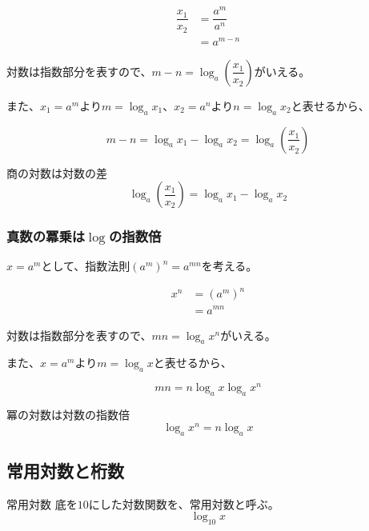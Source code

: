 \documentclass[../math-imaging]{subfiles}
\begin{document}
\begin{align}
  \dfrac{x_1}{x_2} & = \dfrac{a^m}{a^n} \\
                   & = a^{m-n}
\end{align}

対数は指数部分を表すので、$m-n = \log_a \left( \dfrac{x_1}{x_2} \right)$がいえる。

また、$x_1 = a^m$より$m = \log_a x_1$、$x_2 = a^n$より$n = \log_a x_2$と表せるから、

\begin{equation}
  m - n = \log_a x_1 - \log_a x_2 = \log_a \left( \dfrac{x_1}{x_2} \right)
\end{equation}

\begin{theorem}{商の対数は対数の差}
  \LARGE
  \begin{equation}
    \log_a \left( \dfrac{x_1}{x_2} \right) = \log_a x_1 - \log_a x_2
  \end{equation}
\end{theorem}

\subsubsection{真数の冪乗は$\log$の指数倍}

$x = a^m$として、指数法則$(a^m)^n = a^{mn}$を考える。

\begin{align}
  x^n & = (a^m)^n \\
      & = a^{mn}
\end{align}

対数は指数部分を表すので、$mn = \log_a x^n$がいえる。

また、$x = a^m$より$m = \log_a x$と表せるから、

\begin{equation}
  mn = n \log_a x \log_a x^n
\end{equation}

\begin{theorem}{冪の対数は対数の指数倍}
  \LARGE
  \begin{equation}
    \log_a x^n = n \log_a x
  \end{equation}
\end{theorem}

\subsection{常用対数と桁数}

\begin{definition}{常用対数}
  底を$10$にした対数関数を、常用対数と呼ぶ。
  \LARGE
  \begin{equation}
    \log_{10} x
  \end{equation}
\end{definition}
\end{document}
